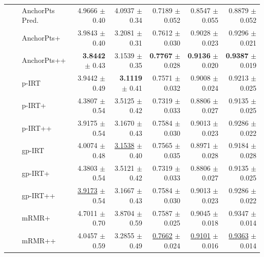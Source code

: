 \begin{longtable}{llp{}rrrrr}
 &  & AnchorPts Pred. & 4.9666 {\scriptsize $\pm$ 0.40} & 4.0937 {\scriptsize $\pm$ 0.34} & 0.7189 {\scriptsize $\pm$ 0.052} & 0.8547 {\scriptsize $\pm$ 0.055} & 0.8879 {\scriptsize $\pm$ 0.052} \\
 &  & AnchorPts+ & 3.9843 {\scriptsize $\pm$ 0.40} & 3.2081 {\scriptsize $\pm$ 0.31} & 0.7612 {\scriptsize $\pm$ 0.030} & 0.9028 {\scriptsize $\pm$ 0.023} & 0.9296 {\scriptsize $\pm$ 0.021} \\
 &  & AnchorPts++ & \textbf{3.8442} {\scriptsize $\pm$ 0.43} & 3.1539 {\scriptsize $\pm$ 0.35} & \textbf{0.7767} {\scriptsize $\pm$ 0.028} & \textbf{0.9136} {\scriptsize $\pm$ 0.020} & \textbf{0.9387} {\scriptsize $\pm$ 0.019} \\
 &  & p-IRT & 3.9442 {\scriptsize $\pm$ 0.49} & \textbf{3.1119} {\scriptsize $\pm$ 0.41} & 0.7571 {\scriptsize $\pm$ 0.032} & 0.9008 {\scriptsize $\pm$ 0.024} & 0.9213 {\scriptsize $\pm$ 0.025} \\
 &  & p-IRT+ & 4.3807 {\scriptsize $\pm$ 0.54} & 3.5125 {\scriptsize $\pm$ 0.42} & 0.7319 {\scriptsize $\pm$ 0.033} & 0.8806 {\scriptsize $\pm$ 0.027} & 0.9135 {\scriptsize $\pm$ 0.025} \\
 &  & p-IRT++ & 3.9175 {\scriptsize $\pm$ 0.54} & 3.1670 {\scriptsize $\pm$ 0.43} & 0.7584 {\scriptsize $\pm$ 0.030} & 0.9013 {\scriptsize $\pm$ 0.023} & 0.9286 {\scriptsize $\pm$ 0.022} \\
 &  & gp-IRT & 4.0074 {\scriptsize $\pm$ 0.48} & \underline{3.1538} {\scriptsize $\pm$ 0.40} & 0.7565 {\scriptsize $\pm$ 0.035} & 0.8971 {\scriptsize $\pm$ 0.028} & 0.9184 {\scriptsize $\pm$ 0.028} \\
 &  & gp-IRT+ & 4.3803 {\scriptsize $\pm$ 0.54} & 3.5121 {\scriptsize $\pm$ 0.42} & 0.7319 {\scriptsize $\pm$ 0.033} & 0.8806 {\scriptsize $\pm$ 0.027} & 0.9135 {\scriptsize $\pm$ 0.025} \\
 &  & gp-IRT++ & \underline{3.9173} {\scriptsize $\pm$ 0.54} & 3.1667 {\scriptsize $\pm$ 0.43} & 0.7584 {\scriptsize $\pm$ 0.030} & 0.9013 {\scriptsize $\pm$ 0.023} & 0.9286 {\scriptsize $\pm$ 0.022} \\
 &  & mRMR+ & 4.7011 {\scriptsize $\pm$ 0.70} & 3.8704 {\scriptsize $\pm$ 0.59} & 0.7587 {\scriptsize $\pm$ 0.025} & 0.9045 {\scriptsize $\pm$ 0.018} & 0.9347 {\scriptsize $\pm$ 0.014} \\
 &  & mRMR++ & 4.0457 {\scriptsize $\pm$ 0.59} & 3.2855 {\scriptsize $\pm$ 0.49} & \underline{0.7662} {\scriptsize $\pm$ 0.024} & \underline{0.9101} {\scriptsize $\pm$ 0.016} & \underline{0.9363} {\scriptsize $\pm$ 0.014} \\

\end{longtable}
